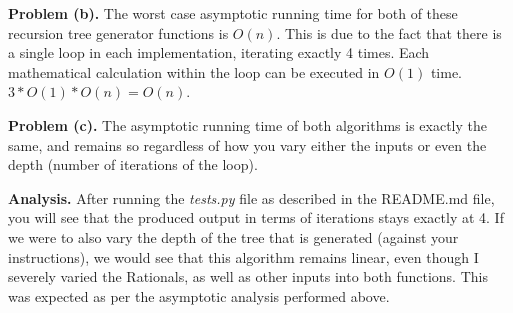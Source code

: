 \documentclass{article}
\begin{document}
\textbf{Problem (b).} The worst case asymptotic running time for both of these recursion tree generator functions is $O(n)$. This is due to the fact that there is a single loop in each implementation, iterating exactly 4 times. Each mathematical calculation within the loop can be executed in $O(1)$ time. $3*O(1) * O(n) = O(n)$.

\hfill

\textbf{Problem (c).} The asymptotic running time of both algorithms is exactly the same, and remains so regardless of how you vary either the inputs or even the depth (number of iterations of the loop).

\hfill

\textbf{Analysis.} After running the \emph{tests.py} file as described in the README.md file, you will see that the produced output in terms of iterations stays exactly at 4. If we were to also vary the depth of the tree that is generated (against your instructions), we would see that this algorithm remains linear, even though I severely varied the Rationals, as well as other inputs into both functions. This was expected as per the asymptotic analysis performed above. 

\newpage
 

\end{document}
